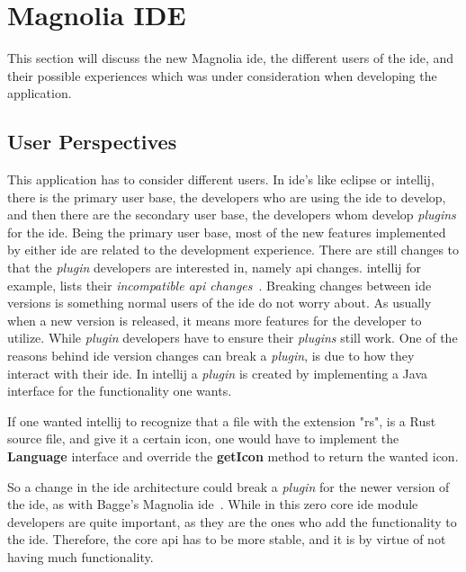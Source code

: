 \chapter{Magnolia IDE} \label{cha:ide}

This section will discuss the new Magnolia \gls*{ide}, the different users of the
\gls*{ide}, and their possible experiences which was under consideration when
developing the application.

\section{User Perspectives}

This application has to consider different users. In \gls*{ide}'s like
\gls*{eclipse} or \gls*{intellij}, there is the primary user base, the developers
who are using the \gls*{ide} to develop, and then there are the secondary user
base, the developers whom develop \textit{plugins} for the \gls*{ide}. Being the
primary user base, most of the new features implemented by either \gls*{ide} are
related to the development experience. There are still changes to that the
\textit{plugin} developers are interested in, namely \gls*{api} changes.
\gls*{intellij} for example, lists their \textit{incompatible \gls*{api} changes}~\cite{intellijBrokenApi}.
Breaking changes between \gls*{ide} versions is something normal users of the
\gls*{ide} do not worry about. As usually when a new version is released, it
means more features for the developer to utilize. While \textit{plugin}
developers have to ensure their \textit{plugins} still work. One of the reasons
behind \gls*{ide} version changes can break a \textit{plugin}, is due to how
they interact with their \gls*{ide}. In \gls*{intellij} a \textit{plugin} is
created by implementing a Java interface for the functionality one wants.

If one wanted \gls*{intellij} to recognize that a file with the extension "rs",
is a Rust source file, and give it a certain icon, one would have to implement
the \textbf{Language} interface and override the \textbf{getIcon} method to
return the wanted icon.

So a change in the \gls*{ide} architecture could break a \textit{plugin} for the
newer version of the \gls*{ide}, as with Bagge's Magnolia \gls*{ide}~\cite{baggeIde}.
While in this zero core \gls*{ide} module developers are quite important, as they
are the ones who add the functionality to the \gls*{ide}. Therefore, the core
\gls*{api} has to be more stable, and it is by virtue of not having much
functionality.

